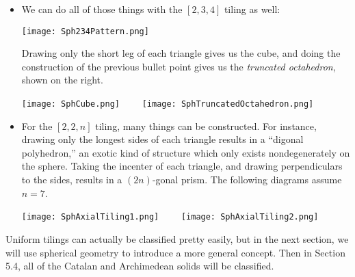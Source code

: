 \documentclass[leqno]{book}
\begin{document}
\begin{itemize}
\item We can do all of those things with the $[2,3,4]$ tiling as well:
\begin{center}
\texttt{[image: Sph234Pattern.png]}
\end{center}
Drawing only the short leg of each triangle gives us the cube, and doing the construction of the previous bullet point gives us the \emph{truncated octahedron}, shown on the right.
\begin{center}
\texttt{[image: SphCube.png]}~~~~
\texttt{[image: SphTruncatedOctahedron.png]}
\end{center}

\item For the $[2,2,n]$ tiling, many things can be constructed.  For instance, drawing only the longest sides of each triangle results in a ``digonal polyhedron,'' an exotic kind of structure which only exists nondegenerately on the sphere.  Taking the incenter of each triangle, and drawing perpendiculars to the sides, results in a $(2n)$-gonal prism.  The following diagrams assume $n=7$.
\begin{center}
\texttt{[image: SphAxialTiling1.png]}~~~~
\texttt{[image: SphAxialTiling2.png]}
\end{center}
\end{itemize}
Uniform tilings can actually be classified pretty easily, but in the next section, we will use spherical geometry to introduce a more general concept.  Then in Section 5.4, all of the Catalan and Archimedean solids will be classified.
\end{document}
